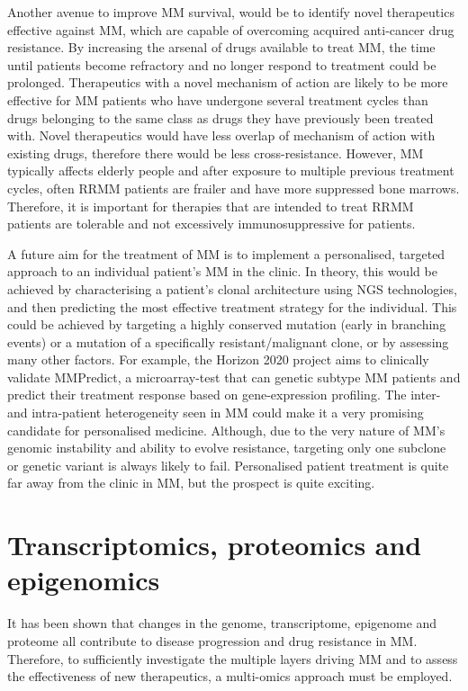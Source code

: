 Another avenue to improve MM survival, would be to identify novel therapeutics effective against MM, which are capable of overcoming acquired
anti-cancer drug resistance.
By increasing the arsenal of drugs available to treat MM, the time until patients become refractory and no longer respond to treatment could be prolonged.
Therapeutics with a novel mechanism of action are likely to be more effective for MM patients who have undergone several treatment cycles than drugs belonging to the same class as drugs they have previously been treated with.
Novel therapeutics would have less overlap of mechanism of action with existing drugs, therefore there would be less cross-resistance.
However, MM typically affects elderly people and after exposure to multiple previous treatment cycles, often RRMM patients are frailer and have more suppressed bone marrows.
Therefore, it is important for therapies that are intended to treat RRMM patients are tolerable and not excessively immunosuppressive for patients.

A future aim for the treatment of MM is to implement a personalised, targeted approach to an individual patient's MM in the clinic.
In theory, this would be achieved by characterising a patient's clonal architecture using NGS technologies, and then predicting the most effective treatment strategy for the individual.
This could be achieved by targeting a highly conserved mutation (early in branching events) or a mutation of a specifically resistant/malignant clone, or by assessing many other factors.
For example, the Horizon 2020 project aims to clinically validate MMPredict, a microarray-test that can genetic subtype MM patients and predict their treatment response based on gene-expression profiling\cite{horizon2020}.
The inter- and intra-patient heterogeneity seen in MM could make it a very promising candidate for personalised medicine.
Although, due to the very nature of MM's genomic instability and ability to evolve resistance, targeting only one subclone or genetic variant is always likely to fail.
Personalised patient treatment is quite far away from the clinic in MM, but the prospect is quite exciting.

%
\afterpage{\clearpage} %
%
\section{Transcriptomics, proteomics and epigenomics}
It has been shown that changes in the genome, transcriptome, epigenome and proteome all contribute to disease progression and drug resistance in MM.
Therefore, to sufficiently investigate the multiple layers driving MM and to assess the effectiveness of new therapeutics, a multi-omics approach must be employed.

